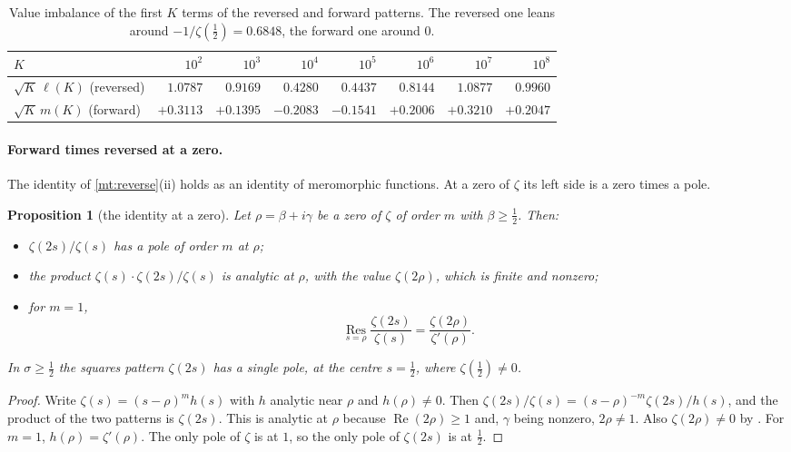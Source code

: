 \documentclass[11pt]{article}
\newtheorem{proposition}[theorem]{Proposition}
\theoremstyle{definition}\newtheorem{definition}[theorem]{Definition}
\theoremstyle{remark}\newtheorem{remark}[theorem]{Remark}
\theoremstyle{definition}\newtheorem{axiom}{Axiom}
\renewcommand{\Re}{\operatorname{Re}}\renewcommand{\Im}{\operatorname{Im}}
\begin{document}
\begin{table}[!htbp]\centering\small
\begin{tabular}{@{}lrrrrrrr@{}}\toprule
$K$ & $10^2$ & $10^3$ & $10^4$ & $10^5$ & $10^6$ & $10^7$ & $10^8$\\\midrule
$\sqrt K\,\ell(K)$ (reversed) & $1.0787$ & $0.9169$ & $0.4280$ & $0.4437$ & $0.8144$ & $1.0877$ & $0.9960$\\
$\sqrt K\,m(K)$ (forward) & $+0.3113$ & $+0.1395$ & $-0.2083$ & $-0.1541$ & $+0.2006$ & $+0.3210$ & $+0.2047$\\\bottomrule
\end{tabular}
\caption{Value imbalance of the first $K$ terms of the reversed and forward patterns. The reversed one leans around $-1/\zeta(\frac12)=0.6848$, the forward one around $0$.}\label{tab:ell}
\end{table}

\paragraph{Forward times reversed at a zero.} The identity of \cref{mt:reverse}(ii) holds as an identity of meromorphic functions. At a zero of $\zeta$ its left side is a zero times a pole.

\begin{proposition}[the identity at a zero]\label{prop:atzero}
Let $\rho=\beta+i\gamma$ be a zero of $\zeta$ of order $m$ with $\beta\ge\frac12$. Then:
\begin{itemize}
\item $\zeta(2s)/\zeta(s)$ has a pole of order $m$ at $\rho$;
\item the product $\zeta(s)\cdot\zeta(2s)/\zeta(s)$ is analytic at $\rho$, with the value $\zeta(2\rho)$, which is finite and nonzero;
\item for $m=1$,
\[
\operatorname*{Res}_{s=\rho}\frac{\zeta(2s)}{\zeta(s)}=\frac{\zeta(2\rho)}{\zeta'(\rho)}.
\]
\end{itemize}
In $\sigma\ge\frac12$ the squares pattern $\zeta(2s)$ has a single pole, at the centre $s=\frac12$, where $\zeta(\frac12)\ne0$.
\end{proposition}

\begin{proof}
Write $\zeta(s)=(s-\rho)^mh(s)$ with $h$ analytic near $\rho$ and $h(\rho)\ne0$. Then $\zeta(2s)/\zeta(s)=(s-\rho)^{-m}\zeta(2s)/h(s)$, and the product of the two patterns is $\zeta(2s)$. This is analytic at $\rho$ because $\Re(2\rho)\ge1$ and, $\gamma$ being nonzero, $2\rho\ne1$. Also $\zeta(2\rho)\ne0$ by \cite[\S3.3]{Titchmarsh}. For $m=1$, $h(\rho)=\zeta'(\rho)$. The only pole of $\zeta$ is at $1$, so the only pole of $\zeta(2s)$ is at $\frac12$.
\end{proof}
\end{document}
